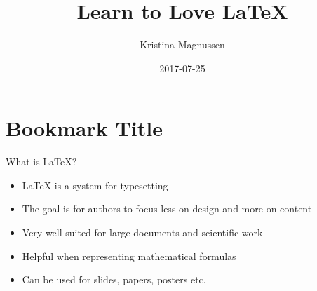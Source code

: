 \documentclass[11pt,t,usepdftitle=false,aspectratio=169]{beamer}
\title{Learn to Love {\LaTeX}}
\author{Kristina Magnussen}
\date{2017-07-25}
\begin{document}
	



\section{Bookmark Title}



\begin{frame}{What is LaTeX?}
	\begin{itemize}
		\item LaTeX is a system for typesetting
		\item The goal is for authors to focus less on design and more on content
		\item Very well suited for large documents and scientific work
		\item Helpful when representing mathematical formulas
		\item Can be used for slides, papers, posters etc. 
	\end{itemize}
\end{frame}
\end{document}
